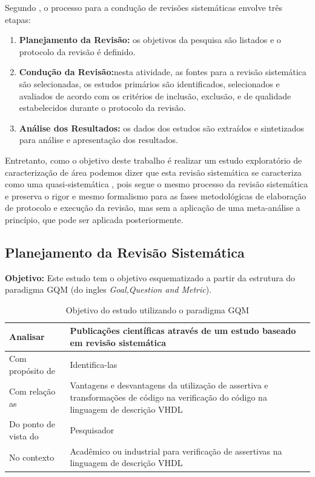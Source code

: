 Segundo \cite{MafraTravassos}, o processo para a condução de revisões sistemáticas envolve três etapas:
\begin{enumerate}
\item \textbf{Planejamento da Revisão:} os objetivos da pesquisa são listados e o protocolo da revisão é definido.
\item \textbf{Condução da Revisão:}nesta atividade, as fontes para a revisão sistemática são selecionadas, os estudos primários são identificados, selecionados e avaliados de acordo com os critérios de inclusão, exclusão, e de qualidade estabelecidos durante o protocolo da revisão.
\item \textbf{Análise dos Resultados:} os dados dos estudos são extraídos e sintetizados para análise e apresentação
dos resultados.
\end{enumerate}

Entretanto, como o objetivo deste trabalho é realizar um estudo exploratório de caracterização de área podemos dizer que esta revisão sistemática se caracteriza como uma quasi-sistemática \cite{travassos2008environment}, pois segue o mesmo processo da revisão sistemática e preserva o rigor e mesmo formalismo para as fases metodológicas de elaboração de protocolo e execução da revisão, mas sem a aplicação de uma meta-análise a princípio, que pode ser aplicada posteriormente.

\subsection{Planejamento da Revisão Sistemática}
\textbf{Objetivo:} Este estudo tem o objetivo esquematizado a partir da estrutura do paradigma GQM (do ingles \textit{Goal,Question and Metric})\cite{basili1994experience}.

\begin{table}[h!]
\centering
\label{}
\begin{tabularx}{\textwidth}{|l|X|}
\hline
Analisar & Publicações científicas através de um estudo baseado em revisão sistemática \\ \hline
Com propósito de & Identifica-las \\ \hline
Com relação as & Vantagens e desvantagens da utilização de assertiva e transformações de código na verificação do código na linguagem de descrição VHDL \\ \hline
Do ponto de vista do & Pesquisador \\ \hline
No contexto & Acadêmico ou industrial para verificação de assertivas na linguagem de descrição VHDL \\ \hline
\end{tabularx}
\caption{Objetivo do estudo utilizando o paradigma GQM}
\end{table}

